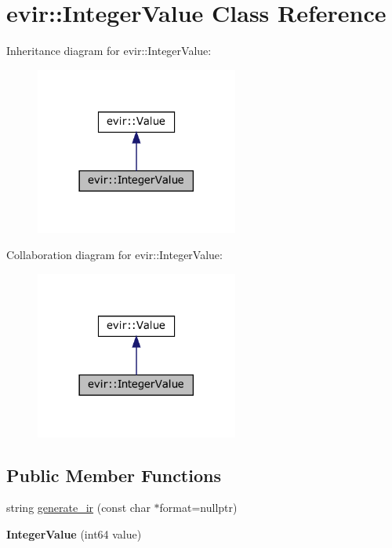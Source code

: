 \hypertarget{classevir_1_1IntegerValue}{}\section{evir\+:\+:Integer\+Value Class Reference}
\label{classevir_1_1IntegerValue}


Inheritance diagram for evir\+:\+:Integer\+Value\+:\nopagebreak
\begin{figure}[H]
\begin{center}
\leavevmode
\includegraphics[width=189pt]{classevir_1_1IntegerValue__inherit__graph}
\end{center}
\end{figure}


Collaboration diagram for evir\+:\+:Integer\+Value\+:\nopagebreak
\begin{figure}[H]
\begin{center}
\leavevmode
\includegraphics[width=189pt]{classevir_1_1IntegerValue__coll__graph}
\end{center}
\end{figure}
\subsection*{Public Member Functions}
\begin{DoxyCompactItemize}
\item 
string \hyperlink{classevir_1_1IntegerValue_a586411c365b2afc18fbd5960dd053d94}{generate\+\_\+ir} (const char $\ast$format=nullptr)
\item 
\mbox{\label{classevir_1_1IntegerValue_ad22144e1c972ad4c6afab52d75049afe}} 
{\bfseries Integer\+Value} (int64 value)
\end{DoxyCompactItemize}
